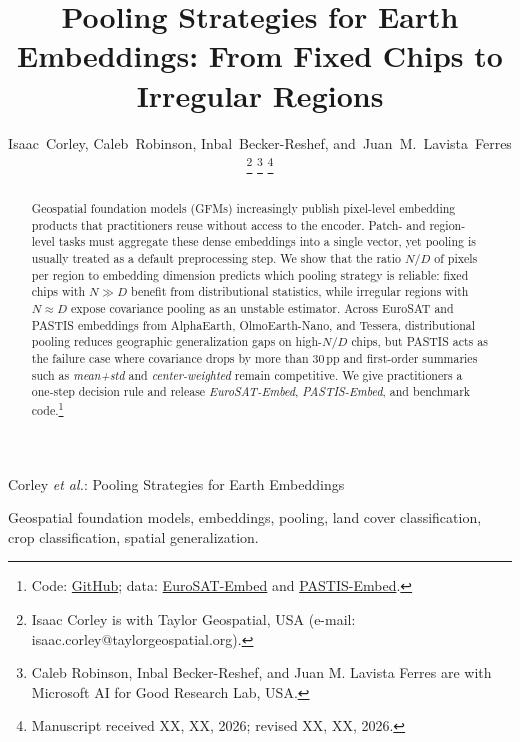 \documentclass[journal]{IEEEtran}
\begin{document}
\title{Pooling Strategies for Earth Embeddings: From Fixed Chips to Irregular Regions}

\author{Isaac~Corley,
        Caleb~Robinson,
        Inbal~Becker-Reshef,
        and~Juan~M.~Lavista~Ferres
\thanks{Isaac Corley is with Taylor Geospatial, USA (e-mail: isaac.corley@taylorgeospatial.org).}
\thanks{Caleb Robinson, Inbal Becker-Reshef, and Juan M. Lavista Ferres are with Microsoft AI for Good Research Lab, USA.}
\thanks{Manuscript received XX, XX, 2026; revised XX, XX, 2026.}}

%
{Corley \MakeLowercase{\textit{et al.}}: Pooling Strategies for Earth Embeddings}

\maketitle

\begin{abstract}
Geospatial foundation models (GFMs) increasingly publish pixel-level embedding products that practitioners reuse without access to the encoder. Patch- and region-level tasks must aggregate these dense embeddings into a single vector, yet pooling is usually treated as a default preprocessing step. We show that the ratio $N/D$ of pixels per region to embedding dimension predicts which pooling strategy is reliable: fixed chips with $N \gg D$ benefit from distributional statistics, while irregular regions with $N \approx D$ expose covariance pooling as an unstable estimator. Across EuroSAT and PASTIS embeddings from AlphaEarth, OlmoEarth-Nano, and Tessera, distributional pooling reduces geographic generalization gaps on high-$N/D$ chips, but PASTIS acts as the failure case where covariance drops by more than 30\,pp and first-order summaries such as \emph{mean+std} and \emph{center-weighted} remain competitive. We give practitioners a one-step decision rule and release \emph{EuroSAT-Embed}, \emph{PASTIS-Embed}, and benchmark code.\footnote{Code: \href{https://github.com/isaaccorley/geopool}{GitHub}; data: \href{https://huggingface.co/datasets/isaaccorley/eurosat-embed}{EuroSAT-Embed} and \href{https://huggingface.co/datasets/isaaccorley/pastis-embed}{PASTIS-Embed}.}
\end{abstract}

\begin{IEEEkeywords}
Geospatial foundation models, embeddings, pooling, land cover classification, crop classification, spatial generalization.
\end{IEEEkeywords}
\end{document}
